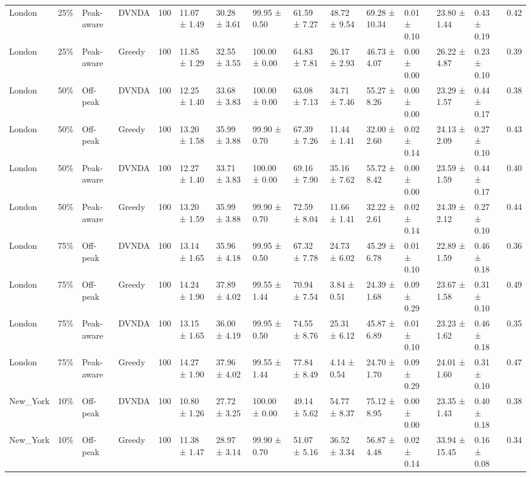\begin{tabular}{lllllllllllllll}
London & 25\% & Peak-aware & DVNDA & 100 & 11.07 ± 1.49 & 30.28 ± 3.61 & 99.95 ± 0.50 & 61.59 ± 7.27 & 48.72 ± 9.54 & 69.28 ± 10.34 & 0.01 ± 0.10 & 23.80 ± 1.44 & 0.43 ± 0.19 & 0.42 \\
London & 25\% & Peak-aware & Greedy & 100 & 11.85 ± 1.29 & 32.55 ± 3.55 & 100.00 ± 0.00 & 64.83 ± 7.81 & 26.17 ± 2.93 & 46.73 ± 4.07 & 0.00 ± 0.00 & 26.22 ± 4.87 & 0.23 ± 0.10 & 0.39 \\
London & 50\% & Off-peak & DVNDA & 100 & 12.25 ± 1.40 & 33.68 ± 3.83 & 100.00 ± 0.00 & 63.08 ± 7.13 & 34.71 ± 7.46 & 55.27 ± 8.26 & 0.00 ± 0.00 & 23.29 ± 1.57 & 0.44 ± 0.17 & 0.38 \\
London & 50\% & Off-peak & Greedy & 100 & 13.20 ± 1.58 & 35.99 ± 3.88 & 99.90 ± 0.70 & 67.39 ± 7.26 & 11.44 ± 1.41 & 32.00 ± 2.60 & 0.02 ± 0.14 & 24.13 ± 2.09 & 0.27 ± 0.10 & 0.43 \\
London & 50\% & Peak-aware & DVNDA & 100 & 12.27 ± 1.40 & 33.71 ± 3.83 & 100.00 ± 0.00 & 69.16 ± 7.90 & 35.16 ± 7.62 & 55.72 ± 8.42 & 0.00 ± 0.00 & 23.59 ± 1.59 & 0.44 ± 0.17 & 0.40 \\
London & 50\% & Peak-aware & Greedy & 100 & 13.20 ± 1.59 & 35.99 ± 3.88 & 99.90 ± 0.70 & 72.59 ± 8.04 & 11.66 ± 1.41 & 32.22 ± 2.61 & 0.02 ± 0.14 & 24.39 ± 2.12 & 0.27 ± 0.10 & 0.44 \\
London & 75\% & Off-peak & DVNDA & 100 & 13.14 ± 1.65 & 35.96 ± 4.18 & 99.95 ± 0.50 & 67.32 ± 7.78 & 24.73 ± 6.02 & 45.29 ± 6.78 & 0.01 ± 0.10 & 22.89 ± 1.59 & 0.46 ± 0.18 & 0.36 \\
London & 75\% & Off-peak & Greedy & 100 & 14.24 ± 1.90 & 37.89 ± 4.02 & 99.55 ± 1.44 & 70.94 ± 7.54 & 3.84 ± 0.51 & 24.39 ± 1.68 & 0.09 ± 0.29 & 23.67 ± 1.58 & 0.31 ± 0.10 & 0.49 \\
London & 75\% & Peak-aware & DVNDA & 100 & 13.15 ± 1.65 & 36.00 ± 4.19 & 99.95 ± 0.50 & 74.55 ± 8.76 & 25.31 ± 6.12 & 45.87 ± 6.89 & 0.01 ± 0.10 & 23.23 ± 1.62 & 0.46 ± 0.18 & 0.35 \\
London & 75\% & Peak-aware & Greedy & 100 & 14.27 ± 1.90 & 37.96 ± 4.02 & 99.55 ± 1.44 & 77.84 ± 8.49 & 4.14 ± 0.54 & 24.70 ± 1.70 & 0.09 ± 0.29 & 24.01 ± 1.60 & 0.31 ± 0.10 & 0.47 \\
New\_York & 10\% & Off-peak & DVNDA & 100 & 10.80 ± 1.26 & 27.72 ± 3.25 & 100.00 ± 0.00 & 49.14 ± 5.62 & 54.77 ± 8.37 & 75.12 ± 8.95 & 0.00 ± 0.00 & 23.35 ± 1.43 & 0.40 ± 0.18 & 0.38 \\
New\_York & 10\% & Off-peak & Greedy & 100 & 11.38 ± 1.47 & 28.97 ± 3.14 & 99.90 ± 0.70 & 51.07 ± 5.16 & 36.52 ± 3.34 & 56.87 ± 4.48 & 0.02 ± 0.14 & 33.94 ± 15.45 & 0.16 ± 0.08 & 0.34 \\

\end{tabular}
